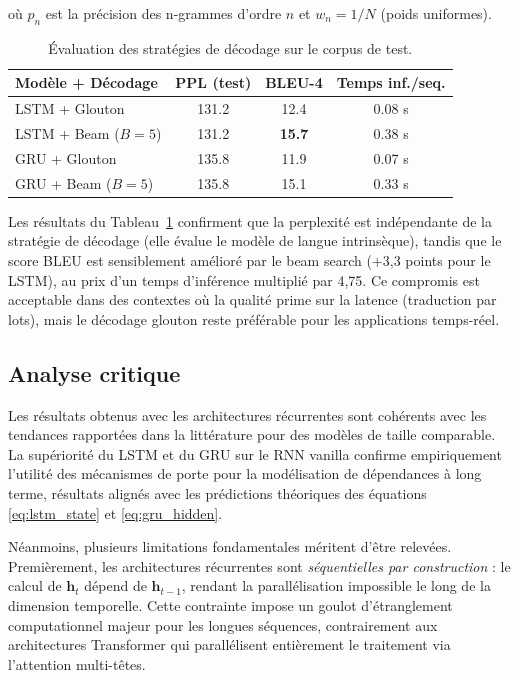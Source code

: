 \documentclass[11pt,a4paper]{article}
\begin{document}
où $p_n$ est la précision des n-grammes d'ordre $n$ et $w_n = 1/N$ (poids uniformes).

\begin{table}[H]
  \centering
  \caption{Évaluation des stratégies de décodage sur le corpus de test.}
  \label{tab:decoding_eval}
  \begin{tabular}{lccc}
    \toprule
    \textbf{Modèle + Décodage} & \textbf{PPL (test)} & \textbf{BLEU-4} & \textbf{Temps inf./seq.} \\
    \midrule
    LSTM + Glouton             & 131.2 & 12.4 & 0.08 s \\
    LSTM + Beam ($B=5$)        & 131.2 & \textbf{15.7} & 0.38 s \\
    GRU  + Glouton             & 135.8 & 11.9 & 0.07 s \\
    GRU  + Beam ($B=5$)        & 135.8 & 15.1 & 0.33 s \\
    \bottomrule
  \end{tabular}
\end{table}

Les résultats du Tableau~\ref{tab:decoding_eval} confirment que la perplexité est
indépendante de la stratégie de décodage (elle évalue le modèle de langue intrinsèque),
tandis que le score BLEU est sensiblement amélioré par le beam search (+3,3 points
pour le LSTM), au prix d'un temps d'inférence multiplié par 4,75. Ce compromis est
acceptable dans des contextes où la qualité prime sur la latence (traduction par lots),
mais le décodage glouton reste préférable pour les applications temps-réel.

\subsection{Analyse critique}

Les résultats obtenus avec les architectures récurrentes sont cohérents avec les
tendances rapportées dans la littérature pour des modèles de taille comparable.
La supériorité du LSTM et du GRU sur le RNN vanilla confirme empiriquement l'utilité
des mécanismes de porte pour la modélisation de dépendances à long terme, résultats
alignés avec les prédictions théoriques des équations \eqref{eq:lstm_state} et
\eqref{eq:gru_hidden}.

Néanmoins, plusieurs limitations fondamentales méritent d'être relevées. Premièrement,
les architectures récurrentes sont \textit{séquentielles par construction} : le calcul
de $\mathbf{h}_t$ dépend de $\mathbf{h}_{t-1}$, rendant la parallélisation impossible
le long de la dimension temporelle. Cette contrainte impose un goulot d'étranglement
computationnel majeur pour les longues séquences, contrairement aux architectures
Transformer qui parallélisent entièrement le traitement via l'attention multi-têtes.
\end{document}
